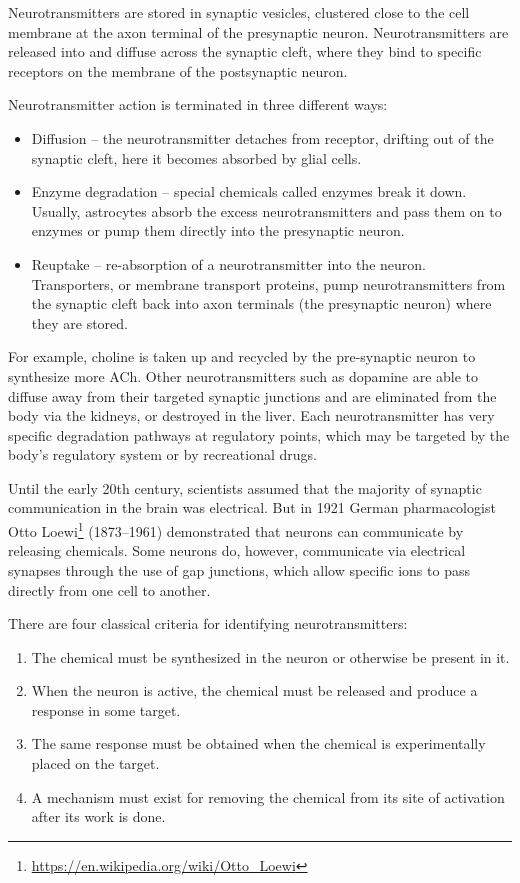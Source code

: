 \documentclass[]{book}
\providecommand{\tightlist}{%
  \setlength{\itemsep}{0pt}\setlength{\parskip}{0pt}}
\let\rmarkdownfootnote\footnote%
\def\footnote{\protect\rmarkdownfootnote}
\renewcommand{\href}[2]{#2\footnote{\url{#1}}}
\begin{document}
Neurotransmitters are stored in synaptic vesicles, clustered close to the cell membrane at the axon terminal of the presynaptic neuron. Neurotransmitters are released into and diffuse across the synaptic cleft, where they bind to specific receptors on the membrane of the postsynaptic neuron.

Neurotransmitter action is terminated in three different ways:

\begin{itemize}
\tightlist
\item
  Diffusion -- the neurotransmitter detaches from receptor, drifting out of the synaptic cleft, here it becomes absorbed by glial cells.
\item
  Enzyme degradation -- special chemicals called enzymes break it down. Usually, astrocytes absorb the excess neurotransmitters and pass them on to enzymes or pump them directly into the presynaptic neuron.
\item
  Reuptake -- re-absorption of a neurotransmitter into the neuron. Transporters, or membrane transport proteins, pump neurotransmitters from the synaptic cleft back into axon terminals (the presynaptic neuron) where they are stored.
\end{itemize}

For example, choline is taken up and recycled by the pre-synaptic neuron to synthesize more ACh. Other neurotransmitters such as dopamine are able to diffuse away from their targeted synaptic junctions and are eliminated from the body via the kidneys, or destroyed in the liver. Each neurotransmitter has very specific degradation pathways at regulatory points, which may be targeted by the body's regulatory system or by recreational drugs.

Until the early 20th century, scientists assumed that the majority of synaptic communication in the brain was electrical. But in 1921 German pharmacologist \href{https://en.wikipedia.org/wiki/Otto_Loewi}{Otto Loewi} (1873--1961) demonstrated that neurons can communicate by releasing chemicals. Some neurons do, however, communicate via electrical synapses through the use of gap junctions, which allow specific ions to pass directly from one cell to another.

There are four classical criteria for identifying neurotransmitters:

\begin{enumerate}
\def\labelenumi{\arabic{enumi}.}
\tightlist
\item
  The chemical must be synthesized in the neuron or otherwise be present in it.
\item
  When the neuron is active, the chemical must be released and produce a response in some target.
\item
  The same response must be obtained when the chemical is experimentally placed on the target.
\item
  A mechanism must exist for removing the chemical from its site of activation after its work is done.
\end{enumerate}
\end{document}
